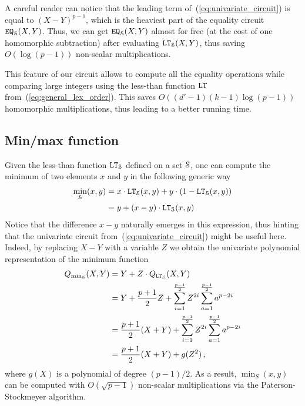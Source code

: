   \begin{remark}
    A careful reader can notice that the leading term of~(\ref{eq:univariate_circuit}) is equal to $(X-Y)^{p-1}$, which is the heaviest part of the equality circuit $\EQ_\S(X,Y)$.
    Thus, we can get $\EQ_\S(X,Y)$ almost for free (at the cost of one homomorphic subtraction) after evaluating $\LT_\S(X,Y)$, thus saving $O(\log (p-1))$ non-scalar multiplications.

    This feature of our circuit allows to compute all the equality operations while comparing large integers using the less-than function $\LT$ from~(\ref{eq:general_lex_order}).
    This saves $O((d'-1)(k-1) \log (p-1))$ homomorphic multiplications, thus leading to a better running time.
  \end{remark}

\subsection{Min/max function}

  Given the less-than function $\LT_\S$ defined on a set $\S$, one can compute the minimum of two elements $x$ and $y$ in the following generic way
  \begin{align*}
    \min_\S(x,y) &= x \cdot \LT_\S(x,y) + y \cdot (1 - \LT_\S(x,y)) \\
    &= y + (x-y) \cdot \LT_\S(x,y)
  \end{align*}
  Notice that the difference $x - y$ naturally emerges in this expression, thus hinting that the univariate circuit from~(\ref{eq:univariate_circuit}) might be useful here.
  Indeed, by replacing $X - Y$ with a variable $Z$ we obtain the univariate polynomial representation of the minimum function 
  \begin{align*}
    Q_{\min_\S}(X,Y) &= Y + Z \cdot Q_{\LT_S}(X,Y) \\
    & = Y + \frac{p+1}{2} Z + \sum_{i=1}^{\frac{p-1}{2}} Z^{2i} \sum_{a=1}^{\frac{p-1}{2}} a^{p-2i} \\
    & = \frac{p+1}{2} (X+Y) + \sum_{i=1}^{\frac{p-1}{2}} Z^{2i} \sum_{a=1}^{\frac{p-1}{2}} a^{p-2i} \\
    & = \frac{p+1}{2} (X+Y) + g(Z^2)\,,
  \end{align*}
  where $g(X)$ is a polynomial of degree $(p-1)/2$. 
  As a result, $\min_S(x,y)$ can be computed with $O(\sqrt{p-1})$ non-scalar multiplications via the Paterson-Stockmeyer algorithm.

